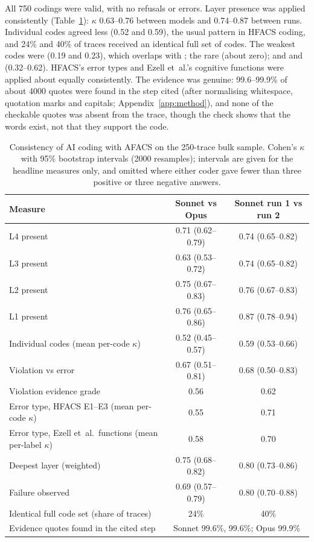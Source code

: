\documentclass[11pt]{article}
\begin{document}
All 750 codings were valid, with no refusals or errors. Layer presence was applied
consistently (Table~\ref{tab:rq3}): $\kappa$ 0.63--0.76 between models and
0.74--0.87 between runs. Individual codes agreed less (0.52 and 0.59), the usual
pattern in HFACS coding, and 24\% and 40\% of traces received an identical full set
of codes. The weakest codes were  (0.19 and 0.23), which overlaps with
; the rare  (about zero); and  and 
(0.32--0.62). HFACS's error types and Ezell et~al.'s cognitive functions were
applied about equally consistently. The evidence was genuine: 99.6--99.9\% of about
\num{4000} quotes were found in the step cited (after normalising whitespace,
quotation marks and capitals; Appendix~\ref{app:method}), and none of the checkable
quotes was absent from the trace, though the check shows that the words exist, not
that they support the code.

\begin{table}[tbp]
\centering
\caption{Consistency of AI coding with AFACS on the 250-trace bulk sample.
Cohen's $\kappa$ with 95\% bootstrap intervals (\num{2000} resamples); intervals are
given for the headline measures only, and omitted where either coder gave fewer
than three positive or three negative answers.}
\label{tab:rq3}
\small
\begin{tabular}{@{}lcc@{}}
\toprule
Measure & Sonnet vs Opus & Sonnet run 1 vs run 2\\
\midrule
L4 present & 0.71 (0.62--0.79) & 0.74 (0.65--0.82)\\
L3 present & 0.63 (0.53--0.72) & 0.74 (0.65--0.82)\\
L2 present & 0.75 (0.67--0.83) & 0.76 (0.67--0.83)\\
L1 present & 0.76 (0.65--0.86) & 0.87 (0.78--0.94)\\
Individual codes (mean per-code $\kappa$) & 0.52 (0.45--0.57) & 0.59 (0.53--0.66)\\
Violation vs error & 0.67 (0.51--0.81) & 0.68 (0.50--0.83)\\
Violation evidence grade & 0.56 & 0.62\\
Error type, HFACS E1--E3 (mean per-code $\kappa$) & 0.55 & 0.71\\
Error type, Ezell et~al.\ functions (mean per-label $\kappa$) & 0.58 & 0.70\\
Deepest layer (weighted) & 0.75 (0.68--0.82) & 0.80 (0.73--0.86)\\
Failure observed & 0.69 (0.57--0.79) & 0.80 (0.70--0.88)\\
Identical full code set (share of traces) & 24\% & 40\%\\
Evidence quotes found in the cited step & \multicolumn{2}{c}{Sonnet 99.6\%, 99.6\%; Opus 99.9\%}\\
\bottomrule
\end{tabular}
\end{table}
\end{document}
